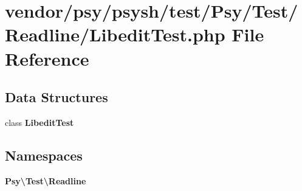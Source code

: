 \section{vendor/psy/psysh/test/\+Psy/\+Test/\+Readline/\+Libedit\+Test.php File Reference}
\label{_libedit_test_8php}
\subsection*{Data Structures}
\begin{DoxyCompactItemize}
\item 
class {\bf Libedit\+Test}
\end{DoxyCompactItemize}
\subsection*{Namespaces}
\begin{DoxyCompactItemize}
\item 
 {\bf Psy\textbackslash{}\+Test\textbackslash{}\+Readline}
\end{DoxyCompactItemize}
